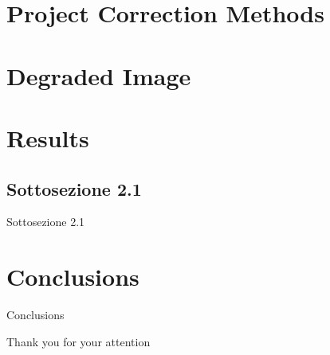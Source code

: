 \documentclass[11pt]{beamer}
\begin{document}
\section{Project Correction Methods}




\section{Degraded Image}


\section{Results}
\subsection{Sottosezione 2.1}
\begin{frame}{Sottosezione 2.1}
\end{frame}

\section{Conclusions}
\begin{frame}{Conclusions}
\end{frame}

\begin{frame}
  \centering
  {\Huge Thank you for your attention}
\end{frame}
\end{document}
